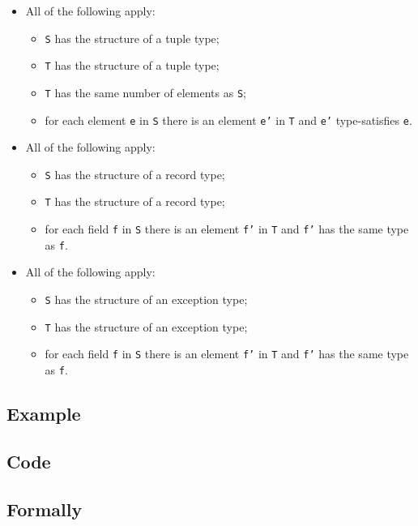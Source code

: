 \documentclass{book}
\begin{document}
\begin{itemize}
  \item All of the following apply:
    \begin{itemize}
    \item \texttt{S} has the structure of a tuple type;
    \item \texttt{T} has the structure of a tuple type;
    \item \texttt{T} has the same number of elements as \texttt{S};
    \item for each element \texttt{e} in \texttt{S} there is an element \texttt{e'} in \texttt{T} and \texttt{e'}
      type-satisfies \texttt{e}.
    \end{itemize}  

  \item All of the following apply:
    \begin{itemize}
    \item \texttt{S} has the structure of a record type;
    \item \texttt{T} has the structure of a record type;
    \item for each field \texttt{f} in \texttt{S} there is an element \texttt{f'} in \texttt{T} and \texttt{f'} has
      the same type as \texttt{f}.
    \end{itemize}

  \item All of the following apply:
    \begin{itemize}
    \item \texttt{S} has the structure of an exception type;
    \item \texttt{T} has the structure of an exception type;
    \item for each field \texttt{f} in \texttt{S} there is an element \texttt{f'} in \texttt{T} and \texttt{f'} has
      the same type as \texttt{f}.
    \end{itemize}
  \end{itemize}

  \subsection{Example}

  \subsection{Code}

\begin{emptyformal}
    \subsection{Formally}
\end{emptyformal}
\end{document}
